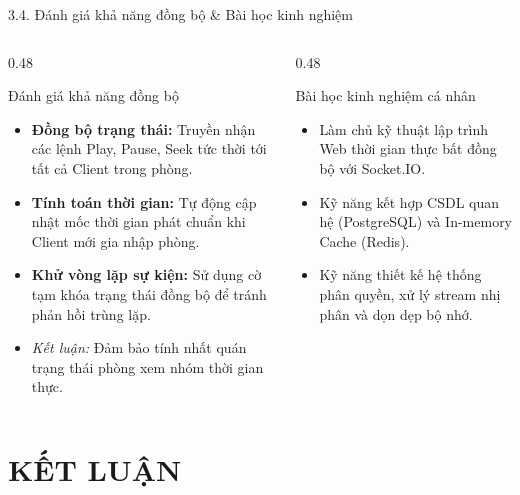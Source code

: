 \documentclass[aspectratio=169,11pt]{beamer}
\begin{document}
\begin{frame}{3.4. Đánh giá khả năng đồng bộ \& Bài học kinh nghiệm}
    \begin{columns}[T]
        \begin{column}{0.48\textwidth}
            \begin{block}{Đánh giá khả năng đồng bộ}
                \begin{itemize}
                    \item \textbf{Đồng bộ trạng thái:} Truyền nhận các lệnh Play, Pause, Seek tức thời tới tất cả Client trong phòng.
                    \item \textbf{Tính toán thời gian:} Tự động cập nhật mốc thời gian phát chuẩn khi Client mới gia nhập phòng.
                    \item \textbf{Khử vòng lặp sự kiện:} Sử dụng cờ tạm khóa trạng thái đồng bộ để tránh phản hồi trùng lặp.
                    \item \textit{Kết luận:} Đảm bảo tính nhất quán trạng thái phòng xem nhóm thời gian thực.
                \end{itemize}
            \end{block}
        \end{column}
        
        \begin{column}{0.48\textwidth}
            \begin{block}{Bài học kinh nghiệm cá nhân}
                \begin{itemize}
                    \item Làm chủ kỹ thuật lập trình Web thời gian thực bất đồng bộ với Socket.IO.
                    \item Kỹ năng kết hợp CSDL quan hệ (PostgreSQL) và In-memory Cache (Redis).
                    \item Kỹ năng thiết kế hệ thống phân quyền, xử lý stream nhị phân và dọn dẹp bộ nhớ.
                \end{itemize}
            \end{block}
        \end{column}
    \end{columns}
\end{frame}

\section{KẾT LUẬN}
\end{document}

